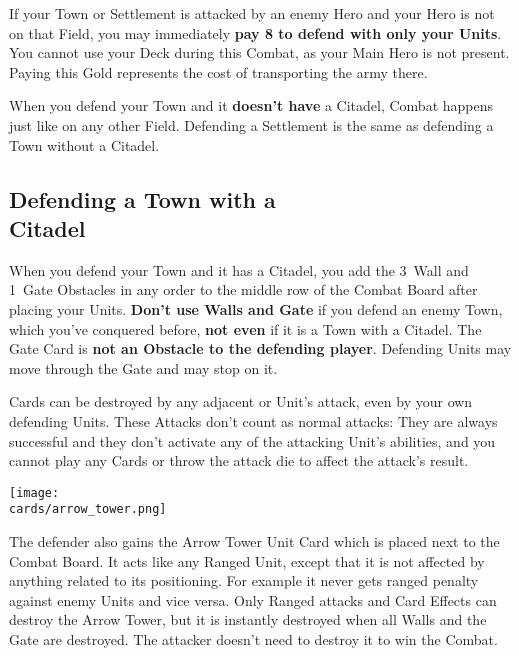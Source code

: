 \begin{multicols*}{2}
If your Town or Settlement is attacked by an enemy Hero and your Hero is not on that Field, you may immediately \textbf{pay 8  to defend with only your Units}.
You cannot use your Deck during this Combat, as your Main Hero is not present.
Paying this Gold represents the cost of transporting the army there.

When you defend your Town and it \textbf{doesn't have} a Citadel, Combat happens just like on any other Field.
Defending a Settlement is the same as defending a Town without a Citadel.

\vspace{0.5em}
\par

\subsection*{Defending a Town with a\\Citadel}
When you defend your Town and it has a Citadel, you add the 3~Wall and 1~Gate Obstacles in any order to the middle row of the Combat Board after placing your Units.
\textbf{Don't use Walls and Gate} if you defend an enemy Town, which you've conquered before, \textbf{not even} if it is a Town with a Citadel.
The Gate Card is \textbf{not an Obstacle to the defending player}.
Defending Units may move through the Gate and may stop on it.

 Cards can be destroyed by any adjacent  or  Unit's attack, even by your own defending Units.
These Attacks don't count as normal attacks: They are always successful and they don't activate any of the attacking Unit's  abilities, and you cannot play any Cards or throw the attack die to affect the attack's result.
\vspace*{\fill}
\columnbreak

\begin{center}
  \texttt{[image: \\cards/arrow\_tower.png]}
\end{center}
The defender also gains the Arrow Tower Unit Card which is placed next to the Combat Board.
It acts like any Ranged  Unit, except that it is not affected by anything related to its positioning.
For example it never gets ranged penalty against enemy Units and vice versa.
Only Ranged attacks and Card Effects can destroy the Arrow Tower, but it is instantly destroyed when all Walls and the Gate are destroyed.
The attacker doesn't need to destroy it to win the Combat.


\end{multicols*}
